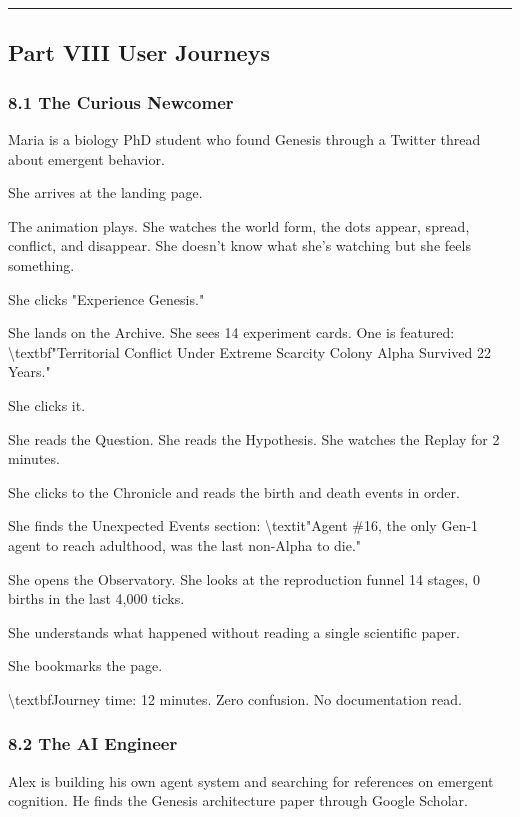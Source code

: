 \documentclass[11pt,a4paper]{article}
\begin{document}
\noindent\rule{\textwidth}{0.4pt}

\subsection*{Part VIII  User Journeys}

\subsubsection*{8.1 The Curious Newcomer}

Maria is a biology PhD student who found Genesis through a Twitter thread about emergent behavior.

She arrives at the landing page.

The animation plays. She watches the world form, the dots appear, spread, conflict, and disappear. She doesn't know what she's watching  but she feels something.

She clicks "Experience Genesis."

She lands on the Archive. She sees 14 experiment cards. One is featured: \textbackslash{}textbf{"Territorial Conflict Under Extreme Scarcity  Colony Alpha Survived 22 Years."}

She clicks it.

She reads the Question. She reads the Hypothesis. She watches the Replay for 2 minutes.

She clicks to the Chronicle and reads the birth and death events in order.

She finds the Unexpected Events section:
\textbackslash{}textit{"Agent \#16, the only Gen-1 agent to reach adulthood, was the last non-Alpha to die."}

She opens the Observatory. She looks at the reproduction funnel  14 stages, 0 births in the last 4,000 ticks.

She understands what happened without reading a single scientific paper.

She bookmarks the page.

\textbackslash{}textbf{Journey time:} 12 minutes. Zero confusion. No documentation read.

\subsubsection*{8.2 The AI Engineer}

Alex is building his own agent system and searching for references on emergent cognition. He finds the Genesis architecture paper through Google Scholar.
\end{document}
